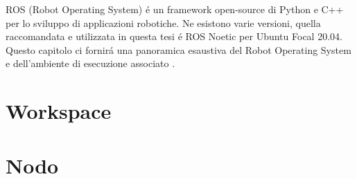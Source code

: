 ROS (Robot Operating System) \'{e} un framework open-source di Python e C++ per lo sviluppo di applicazioni robotiche.
Ne esistono varie versioni, quella raccomandata e utilizzata in questa tesi \'{e} ROS Noetic per Ubuntu Focal 20.04.
Questo capitolo ci fornir\'{a} una panoramica esaustiva del Robot Operating System e dell'ambiente di esecuzione associato 
\cite{ros}.

\section{Workspace}


\section{Nodo}
